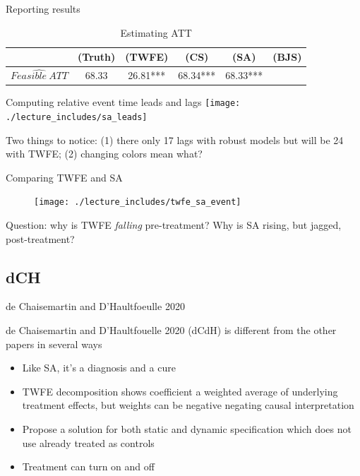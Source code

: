 \documentclass{beamer}
\begin{document}
\begin{frame}{Reporting results}
\begin{table}[htbp]\centering
\small
\caption{Estimating ATT}
\begin{center}
\begin{tabular}{l*{5}{c}}
\hline
\multicolumn{1}{l}{\textbf{}}&
\multicolumn{1}{c}{\textbf{(Truth)}}&
\multicolumn{1}{c}{\textbf{(TWFE)}}&
\multicolumn{1}{c}{\textbf{(CS)}}&
\multicolumn{1}{c}{\textbf{(SA)}}&
\multicolumn{1}{c}{\textbf{(BJS)}}\\
\hline
$\widehat{Feasible\ ATT}$  & 68.33    & 26.81*** & 68.34*** & 68.33***&\\
\hline
\end{tabular}
\end{center}
\end{table}

\end{frame}

\begin{frame}{Computing relative event time leads and lags }
             \texttt{[image: ./lecture\_includes/sa\_leads]}

Two things to notice: (1) there only 17 lags with robust models but will be 24 with TWFE; (2) changing colors mean what?

\end{frame}

\begin{frame}{Comparing TWFE and SA }

\begin{figure}
\begin{center}
             \texttt{[image: ./lecture\_includes/twfe\_sa\_event]}
\end{center}
\end{figure}

Question: why is TWFE \emph{falling} pre-treatment?  Why is SA rising, but jagged, post-treatment?

\end{frame}


\subsection{dCH}

\begin{frame}{de Chaisemartin and D'Haultfoeulle 2020}

de Chaisemartin and D'Haultfouelle 2020 (dCdH) is different from the other papers in several ways
	\begin{itemize}
	\item Like SA, it's a diagnosis and a cure
	\item TWFE decomposition shows coefficient a weighted average of underlying treatment effects, but weights can be negative negating causal interpretation
	\item Propose a solution for both static and dynamic specification which does not use already treated as controls
	\item Treatment can turn on and off
	\end{itemize}

\end{frame}
\end{document}
